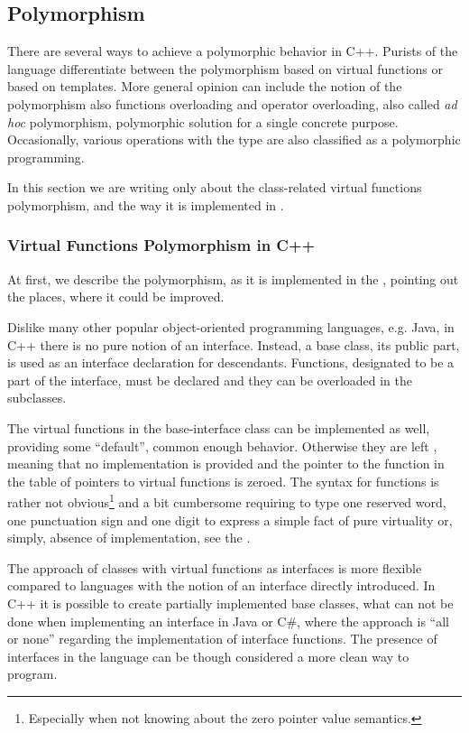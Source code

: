 \subsection{Polymorphism}

There are several ways to achieve a polymorphic behavior in C++. Purists of the language differentiate 
between the polymorphism based on virtual functions or based on templates. More general opinion can include
the notion of the polymorphism also functions overloading and operator overloading, also called 
\emph{ad hoc} polymorphism, polymorphic solution for a single concrete purpose. 
Occasionally, various operations with the  type are also classified as a polymorphic programming.

In this section we are writing only about the class-related virtual functions polymorphism, and the way it is 
implemented in \pcpp.

\subsubsection{Virtual Functions Polymorphism in C++}
\label{cpppolydefs}

At first, we describe the polymorphism, as it is implemented in the \cpppl, pointing out the places, where it could be improved.

Dislike many other popular object-oriented programming languages, e.g. Java, in C++ there is no pure notion of
an interface. Instead, a base class, its public part, is used as an interface declaration for descendants. 
Functions, designated to be a part of the interface, must be declared  and they can be overloaded in
the subclasses.


The virtual functions in the base-interface class can be implemented as well, providing some ``default'',
common enough behavior. Otherwise they are left , meaning that no implementation is provided
and the pointer to the function in the table of pointers to virtual functions is zeroed. The syntax
for  functions is rather not obvious\footnote{Especially when not knowing about the zero pointer value semantics.}
and a bit cumbersome requiring to type one reserved word, one punctuation sign and one digit to 
express a simple fact of pure virtuality or, simply, absence of implementation, see the .


The approach of classes with virtual functions as interfaces is more flexible compared to languages with the notion 
of an interface directly introduced.
In C++ it is possible to create partially implemented base classes, what can not be done when implementing
an interface in Java or C\#, where the approach is ``all or none'' regarding the implementation of interface
functions. The presence of interfaces in the language can be though considered a more clean way to program.

